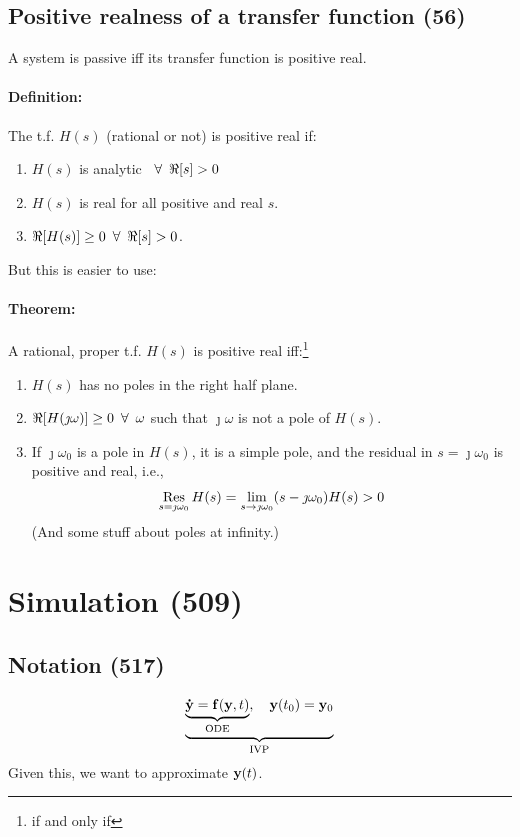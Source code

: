 \documentclass[a4paper, 12pt]{article}
\begin{document}
\subsection{Positive realness of a transfer function (56)}
A system is passive iff its transfer function is positive real.
\paragraph{Definition:} The t.f. \(H(s)\) (rational or not) is positive real if:
\begin{enumerate}
	\item \(H(s)\) is analytic \( \enskip \forall \enskip \Re[s] > 0 \)
	\item \(H(s)\) is real for all positive and real \(s\).
	\item \(\Re[H(s)] \geq 0 \enskip \forall \enskip \Re [s] > 0\).
\end{enumerate}
But this is easier to use:
\paragraph{Theorem:} A rational, proper t.f. \(H(s)\) is positive real iff:\footnote{if and only if}
\begin{enumerate}
	\item \( H(s) \) has no poles in the right half plane.
	\item \( \Re[H(\jmath \omega)] \geq 0 \enskip \forall \enskip \omega \) such that \( \jmath \omega \) is not a pole of \( H(s) \).
	\item If \( \jmath \omega_0 \) is a pole in \( H(s) \), it is a simple pole, and the residual in \( s = \jmath \omega_0 \) is positive and real, i.e.,
	\[ \residual_{s = \jmath \omega_0} H(s) = \lim_{s \to \jmath \omega_0} (s - \jmath \omega_0) H(s) > 0 \] (And some stuff about poles at infinity.)
\end{enumerate}

\section{Simulation (509)}
\subsection{Notation (517)}
\begin{equation}\label{eq:ivp}
	\underbrace{
		\underbrace{
			\mathbf{\mathbf{\dot{y}}} = \mathbf{f}(\mathbf{y}, t)
		}_{
			\text{ODE}
		}
		,\quad \mathbf{y}(t_0) = \mathbf{y}_0
	}_{\text{IVP}}
\end{equation}
Given this, we want to approximate \( \mathbf{y}(t) \).
\end{document}
